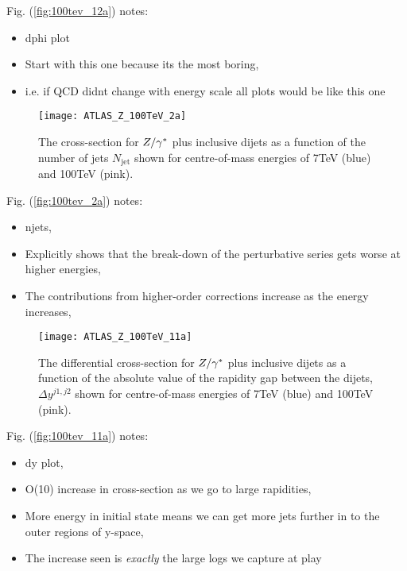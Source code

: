 	Fig. (\eqref{fig:100tev_12a}) notes:

	\begin{itemize}
		\item dphi plot
		\item Start with this one because its the most boring,
		\item i.e. if QCD didnt change with energy scale all plots would be like this one
	\end{itemize}

	\begin{figure}[h]
		\centering
		\texttt{[image: ATLAS\_Z\_100TeV\_2a]}
		\caption{The cross-section for $Z/\gamma^*$ plus inclusive dijets as a function of the number of jets $N_{\text{jet}}$ shown for
		         centre-of-mass energies of 7TeV (blue) and 100TeV (pink).}
		\label{fig:100tev_2a}
	\end{figure}

	Fig. (\eqref{fig:100tev_2a}) notes:

	\begin{itemize}
		\item njets,
		\item Explicitly shows that the break-down of the perturbative series gets worse at higher energies,
		\item The contributions from higher-order corrections increase as the energy increases,
	\end{itemize}

	\begin{figure}[h]
		\centering
		\texttt{[image: ATLAS\_Z\_100TeV\_11a]}
		\caption{The differential cross-section for $Z/\gamma^*$ plus inclusive dijets as a function of the absolute value of the
		         rapidity gap between the dijets, $\Delta y^{j1, j2}$ shown for centre-of-mass energies of 7TeV (blue) and
		         100TeV (pink).}
		\label{fig:100tev_11a}
	\end{figure}

	Fig. (\eqref{fig:100tev_11a}) notes:

	\begin{itemize}
		\item dy plot,
		\item O(10) increase in cross-section as we go to large rapidities,
		\item More energy in initial state means we can get more jets further in to the outer regions of y-space,
		\item The increase seen is \emph{exactly} the large logs we capture at play
	\end{itemize}

